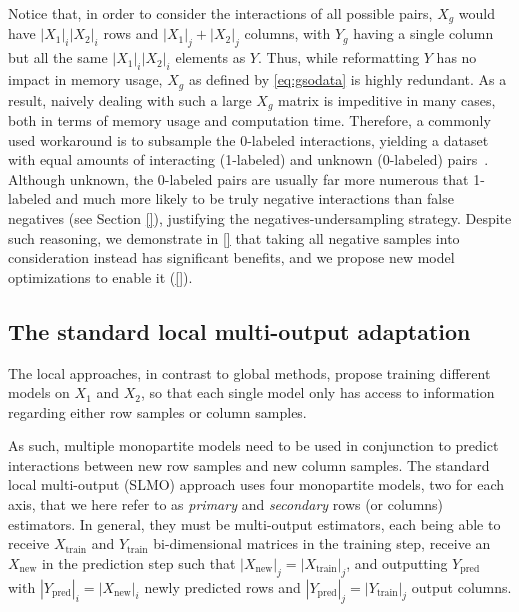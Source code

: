 Notice that, in order to consider the interactions of all possible pairs, $X_g$ would have $|X_1|_i|X_2|_i$ rows and $|X_1|_j+|X_2|_j$ columns, with $Y_g$ having a single column but all the same $|X_1|_i|X_2|_i$ elements as $Y$. Thus, while reformatting $Y$ has no impact in memory usage, $X_g$ as defined by \autoref{eq:gsodata} is highly redundant.
As a result, naively dealing with such a large $X_g$ matrix is impeditive in many cases, both in terms of memory usage and computation time. Therefore, a commonly used workaround is to subsample the 0-labeled interactions, yielding a dataset with equal amounts of interacting (1-labeled) and unknown (0-labeled) pairs~\cite{}.
Although unknown, the 0-labeled pairs are usually far more numerous that 1-labeled and much more likely to be truly negative interactions than false negatives (see Section \ref{}), justifying the negatives-undersampling strategy. Despite such reasoning, we demonstrate in \autoref{} that taking all negative samples into consideration instead has significant benefits, and we propose new model optimizations to enable it (\autoref{}).



\subsection{The standard local multi-output adaptation}
\label{sec:slmo}

The local approaches, in contrast to global methods, propose training different models on $X_1$ and $X_2$, so that each single model only has access to information regarding either row samples or column samples.

As such, multiple monopartite models need to be used in conjunction to predict interactions between new row samples and new column samples. The standard local multi-output (SLMO) approach uses four monopartite models, two for each axis, that we here refer to as \emph{primary} and \emph{secondary} rows (or columns) estimators. In general, they must be multi-output estimators, each being able to receive $X_\text{train}$ and $Y_\text{train}$ bi-dimensional matrices in the training step, receive an $X_\text{new}$ in the prediction step such that $|X_\text{new}|_j=|X_\text{train}|_j$, and outputting $Y_\text{pred}$ with $|Y_\text{pred}|_i=|X_\text{new}|_i$ newly predicted rows and $|Y_\text{pred}|_j = |Y_\text{train}|_j$ output columns.

